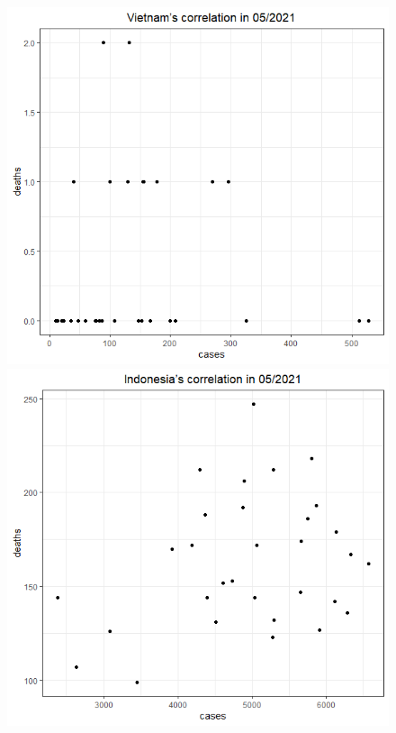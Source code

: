 \documentclass[english,10pt,table]{beamer}
\begin{document}
{\begin{figure}[H]
\begin{center}
        \includegraphics[scale = 0.2]{ix/ix.2/VN_05_2021.png}
        \includegraphics[scale = 0.2]{ix/ix.2/IDN_05_2021.png}

\end{center}
\end{figure}}
\end{document}
